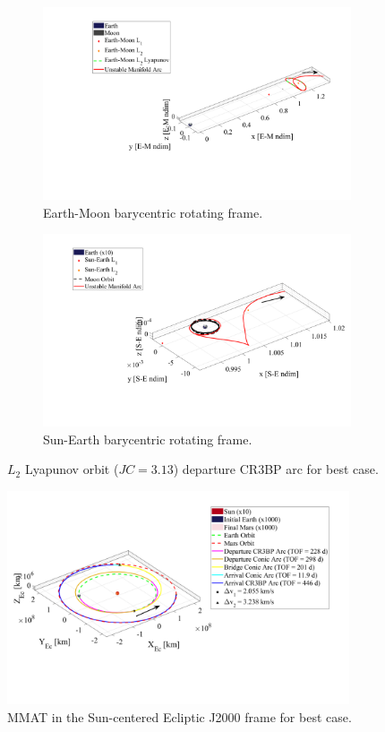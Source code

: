 \begin{figure}[!htb]
    \begin{subfigure}[h]{0.495\linewidth}
        \includegraphics[width=\textwidth]{figures/BestEM.pdf}
        \caption{Earth-Moon barycentric rotating frame.}
    \end{subfigure}
    \hfill
    \begin{subfigure}[h]{0.495\linewidth}
        \includegraphics[width=\textwidth]{figures/BestSE.pdf}
        \caption{Sun-Earth barycentric rotating frame.}
    \end{subfigure}
    \caption{$L_{2}$ Lyapunov orbit ($JC=3.13$) departure CR3BP arc for best case.}
    \label{fig:bestE}
\end{figure}

\begin{figure}[!htb]
    \centering
    \includegraphics[width=0.9\textwidth]{figures/BestMMAT.pdf}
    \caption{MMAT in the Sun-centered Ecliptic J2000 frame for best case.}
    \label{fig:bestMMAT}
\end{figure}
